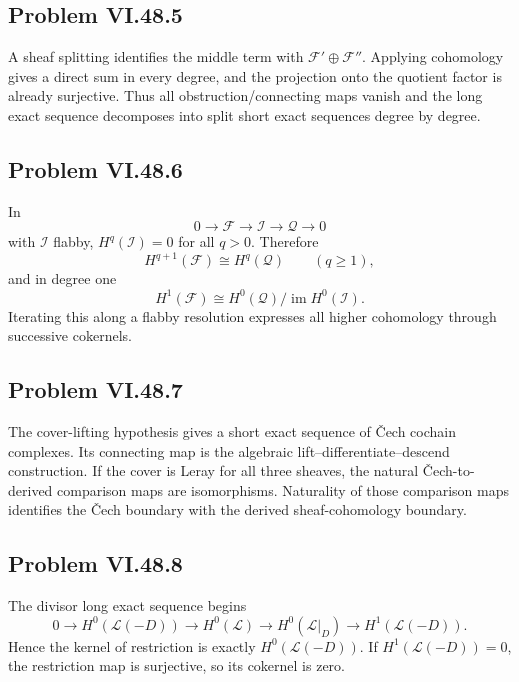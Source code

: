 \subsection*{Problem VI.48.5}
\begin{solution}
A sheaf splitting identifies the middle term with \(\mathcal F'\oplus\mathcal F''\).  Applying cohomology gives a direct sum in every degree, and the projection onto the quotient factor is already surjective.  Thus all obstruction/connecting maps vanish and the long exact sequence decomposes into split short exact sequences degree by degree.
\end{solution}

\subsection*{Problem VI.48.6}
\begin{solution}
In
\[
0\to\mathcal F\to\mathcal I\to\mathcal Q\to0
\]
with \(\mathcal I\) flabby, \(H^q(\mathcal I)=0\) for all \(q>0\).  Therefore
\[
H^{q+1}(\mathcal F)\cong H^q(\mathcal Q)\qquad(q\ge1),
\]
and in degree one
\[
H^1(\mathcal F)\cong H^0(\mathcal Q)/\operatorname{im}H^0(\mathcal I).
\]
Iterating this along a flabby resolution expresses all higher cohomology through successive cokernels.
\end{solution}

\subsection*{Problem VI.48.7}
\begin{solution}
The cover-lifting hypothesis gives a short exact sequence of Čech cochain complexes.  Its connecting map is the algebraic lift--differentiate--descend construction.  If the cover is Leray for all three sheaves, the natural Čech-to-derived comparison maps are isomorphisms.  Naturality of those comparison maps identifies the Čech boundary with the derived sheaf-cohomology boundary.
\end{solution}

\subsection*{Problem VI.48.8}
\begin{solution}
The divisor long exact sequence begins
\[
0\to H^0(\mathcal L(-D))\to H^0(\mathcal L)\to H^0(\mathcal L|_D)
\to H^1(\mathcal L(-D)).
\]
Hence the kernel of restriction is exactly \(H^0(\mathcal L(-D))\).  If \(H^1(\mathcal L(-D))=0\), the restriction map is surjective, so its cokernel is zero.
\end{solution}

